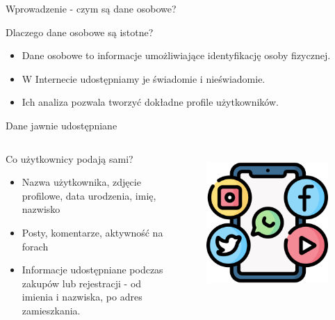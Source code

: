
\begin{frame}{Wprowadzenie - czym są dane osobowe?}
    \begin{alertblock}{Dlaczego dane osobowe są istotne?}
      \begin{itemize}
        \item Dane osobowe to informacje umożliwiające identyfikację osoby fizycznej.\cite{PII_USDE}
        \item W Internecie udostępniamy je świadomie i nieświadomie.
        \item Ich analiza pozwala tworzyć dokładne profile użytkowników.
      \end{itemize}
    \end{alertblock}
  \end{frame}
  
  
  \begin{frame}{Dane jawnie udostępniane}
  \begin{columns}[c]
      \begin{alertblock}{Co użytkownicy podają sami?}
        \begin{itemize}
          \item Nazwa użytkownika, zdjęcie profilowe, data urodzenia, imię, nazwisko
          \item Posty, komentarze, aktywność na forach
          \item Informacje udostępniane podczas zakupów lub rejestracji - od imienia i nazwiska, po adres zamieszkania.\cite{CYB_DEF_NAJCZĘSTRZE_DANE}
        \end{itemize}
      \end{alertblock}
      \begin{figure}
        \centering
        \includegraphics[height=0.45\textheight]{images/social-media.png}
        \label{fig:social-media}
      \end{figure}
  \end{columns}
  \end{frame}
  
